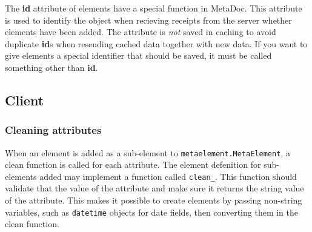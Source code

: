 The \textbf{id} attribute of elements have a special function in MetaDoc. This 
attribute is used to identify the object when recieving receipts from the server 
whether elements have been added. The attribute is \textit{not} saved in caching 
to avoid duplicate \textbf{id}s when resending cached data together with new 
data. If you want to give elements a special identifier that should be saved, it 
must be called something other than \textbf{id}.

\subsection{Client}

\subsubsection{Cleaning attributes}

When an element is added as a sub-element to \texttt{metaelement.MetaElement}, a 
clean function is called for each attribute. The element defenition for 
sub-elements added may implement a function called 
\texttt{clean\_<attribute name>}. This function should validate that the value 
of the attribute and make sure it returns the string value of the attribute. 
This makes it possible to create elements by passing non-string variables, such 
as \texttt{datetime} objects for date fields, then converting them in the clean 
function. 
